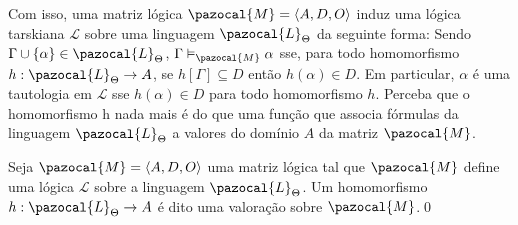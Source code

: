         Com isso, uma matriz lógica $\pazocal{M} = \langle A, D, O \rangle$ induz uma lógica tarskiana $\mathcal{L}$ sobre uma linguagem $\pazocal{L}_{\Theta}$ da seguinte forma: Sendo $\Gamma \cup \{\alpha\} \in \pazocal{L}_{\Theta}$, $\Gamma \vDash_{\pazocal{M}} \alpha$ sse, para todo homomorfismo $h : \pazocal{L}_{\Theta} \rightarrow A$, se $h[\Gamma] \subseteq D$ então $h(\alpha) \in D$. Em particular, $\alpha$ é uma tautologia em $\mathcal{L}$ sse $h(\alpha) \in D$ para todo homomorfismo $h$. Perceba que o homomorfismo h nada mais é do que uma função que associa fórmulas da linguagem $\pazocal{L}_{\Theta}$ a valores do domínio $A$ da matriz $\pazocal{M}$.

        \begin{definicao}[Valoração]
            Seja $\pazocal{M} = \langle A, D, O \rangle$ uma matriz lógica tal que $\pazocal{M}$ define uma lógica $\mathcal{L}$ sobre a linguagem $\pazocal{L}_{\Theta}$. Um homomorfismo $h : \pazocal{L}_{\Theta} \rightarrow A$ é dito uma valoração sobre $\pazocal{M}$.\qed{}
        \end{definicao}



